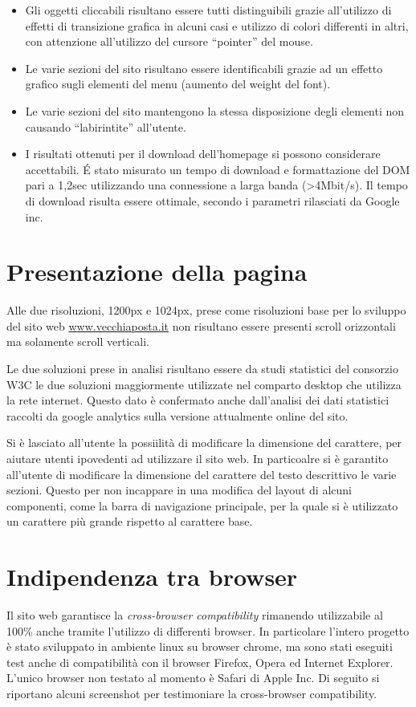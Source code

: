 \documentclass[a4paper,12pt,hidelinks]{report}
\begin{document}
\begin{itemize}
 \item Gli oggetti cliccabili risultano essere tutti distinguibili grazie all'utilizzo di effetti di transizione grafica in alcuni casi e utilizzo di colori differenti in altri,
 con attenzione all'utilizzo del cursore ``pointer'' del mouse.
 \item Le varie sezioni del sito risultano essere identificabili grazie ad un effetto grafico sugli elementi del menu (aumento del weight del font). 
 \item Le varie sezioni del sito mantengono la stessa disposizione degli elementi non causando ``labirintite'' all'utente.
 \item I risultati ottenuti per il download dell'homepage si possono considerare accettabili. \'E stato misurato un tempo di download e formattazione del DOM pari a 1,2sec utilizzando
una connessione a larga banda (>4Mbit/s). Il tempo di download risulta essere ottimale, secondo i parametri rilasciati da Google inc.
\end{itemize}
 
\newpage
\section*{Presentazione della pagina}
Alle due risoluzioni, 1200px e 1024px, prese come risoluzioni base per lo sviluppo del sito web \url{www.vecchiaposta.it} non risultano essere presenti 
scroll orizzontali ma solamente scroll verticali. 
\par Le due soluzioni prese in analisi risultano essere da studi statistici del consorzio W3C le due soluzioni maggiormente utilizzate
nel comparto desktop che utilizza la rete internet. 
Questo dato è confermato anche dall'analisi dei dati statistici raccolti da google analytics sulla versione attualmente online del sito.
\par Si è lasciato all'utente la possiilità di modificare la dimensione del carattere, per aiutare utenti ipovedenti ad utilizzare il sito web. In particoalre si è garantito all'utente 
di modificare la dimensione del carattere del testo descrittivo le varie sezioni. Questo per non incappare in una modifica del layout di alcuni componenti, come la barra di navigazione
principale, per la quale si è utilizzato un carattere più grande rispetto al carattere base.
\newpage
\section*{Indipendenza tra browser}
Il sito web garantisce la \textit{cross-browser compatibility} rimanendo utilizzabile al 100\% anche tramite l'utilizzo di differenti browser.
In particolare l'intero progetto è stato sviluppato in ambiente linux su browser chrome, ma sono stati eseguiti test anche di compatibilità con
il browser Firefox, Opera ed Internet Explorer. L'unico browser non testato al momento è Safari di Apple Inc.
Di seguito si riportano alcuni screenshot per testimoniare la cross-browser compatibility.
\end{document}
